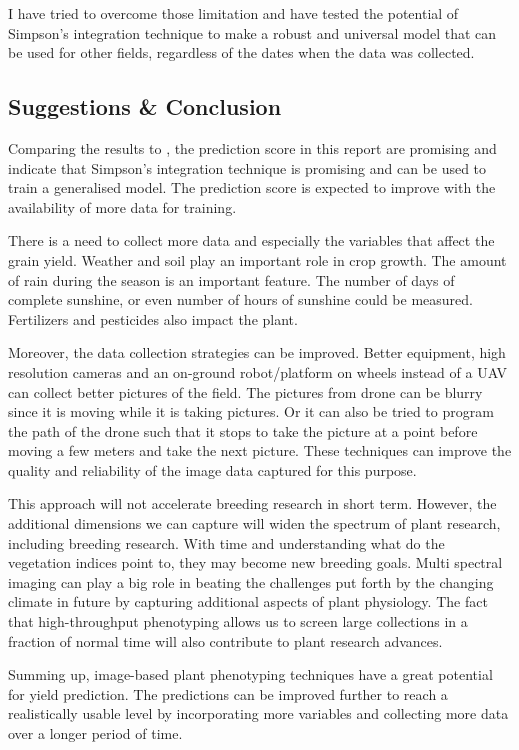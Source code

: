 \documentclass[sigconf, nonacm, natbib, screen, balance=False]{acmart}
\begin{document}
I have tried to overcome those limitation and have tested the potential of Simpson's integration technique to make a robust and universal model that can be used for other fields, regardless of the dates when the data was collected. 

\subsection{Suggestions \& Conclusion}\label{sec:comp_lied}
Comparing the results to \citet{lied}, the prediction score in this report are promising and indicate that Simpson's integration technique is promising and can be used to train a generalised model. The prediction score is expected to improve with the availability of more data for training.

There is a need to collect more data and especially the variables that affect the grain yield. Weather and soil play an important role in crop growth. The amount of rain during the season is an important feature. The number of days of complete sunshine, or even number of hours of sunshine could be measured. Fertilizers and pesticides also impact the plant.

Moreover, the data collection strategies can be improved. Better equipment, high resolution cameras and an on-ground robot/platform on wheels instead of a UAV can collect better pictures of the field. The pictures from drone can be blurry since it is moving while it is taking pictures. Or it can also be tried to program the path of the drone such that it stops to take the picture at a point before moving a few meters and take the next picture. These techniques can improve the quality and reliability of the image data captured for this purpose.

This approach will not accelerate breeding research in short term. However, the additional dimensions we can capture will widen the spectrum of plant research, including breeding research. With time and understanding what do the vegetation indices point to, they may become new breeding goals. Multi spectral imaging can play a big role in beating the challenges put forth by the changing climate in future by capturing additional aspects of plant physiology. The fact that high-throughput phenotyping allows us to screen large collections in a fraction of normal time will also contribute to plant research advances.

Summing up, image-based plant phenotyping techniques have a great potential for yield prediction. The predictions can be improved further to reach a realistically usable level by incorporating more variables and collecting more data over a longer period of time.
\end{document}
